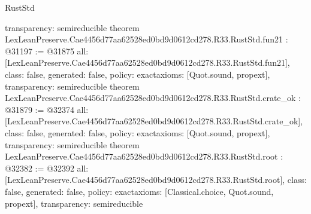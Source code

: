 \begin{lexlean}{RustStd}
\begin{coremodule}
{  transparency: semireducible
}
theorem LexLeanPreserve.Cae4456d77aa62528ed0bd9d0612cd278.R33.RustStd.fun21 : @31197 := @31875 {
  all: [LexLeanPreserve.Cae4456d77aa62528ed0bd9d0612cd278.R33.RustStd.fun21],
  class: false,
  generated: false,
  policy: exact{axioms: [Quot.sound, propext]},
  transparency: semireducible
}
theorem LexLeanPreserve.Cae4456d77aa62528ed0bd9d0612cd278.R33.RustStd.crate_ok : @31879 := @32374 {
  all: [LexLeanPreserve.Cae4456d77aa62528ed0bd9d0612cd278.R33.RustStd.crate_ok],
  class: false,
  generated: false,
  policy: exact{axioms: [Quot.sound, propext]},
  transparency: semireducible
}
theorem LexLeanPreserve.Cae4456d77aa62528ed0bd9d0612cd278.R33.RustStd.root : @32382 := @32392 {
  all: [LexLeanPreserve.Cae4456d77aa62528ed0bd9d0612cd278.R33.RustStd.root],
  class: false,
  generated: false,
  policy: exact{axioms: [Classical.choice, Quot.sound, propext]},
  transparency: semireducible
}


\end{coremodule}
\end{lexlean}
